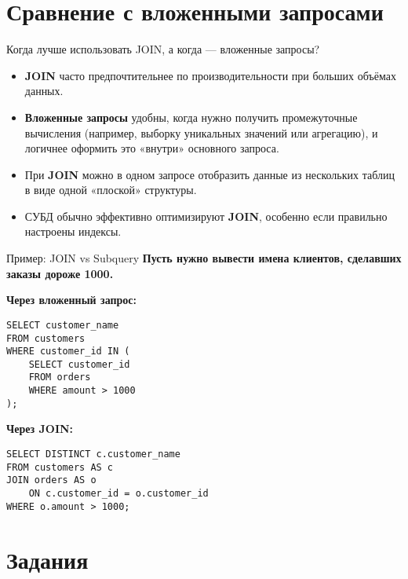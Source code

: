 \documentclass{beamer}
\begin{document}
\section{Сравнение с вложенными запросами}
\begin{frame}{Когда лучше использовать JOIN, а когда — вложенные запросы?}
	\begin{itemize}
		\item \textbf{JOIN} часто предпочтительнее по производительности при больших объёмах данных.
		\item \textbf{Вложенные запросы} удобны, когда нужно получить промежуточные вычисления
		      (например, выборку уникальных значений или агрегацию), и логичнее оформить это «внутри» основного запроса.
		\item При \textbf{JOIN} можно в одном запросе отобразить данные из нескольких таблиц
		      в виде одной «плоской» структуры.
		\item СУБД обычно эффективно оптимизируют \textbf{JOIN}, особенно если правильно настроены индексы.
	\end{itemize}
\end{frame}

\begin{frame}[fragile]{Пример: JOIN vs Subquery}
	\textbf{Пусть нужно вывести имена клиентов, сделавших заказы дороже 1000.}

	\textbf{Через вложенный запрос:}
	\begin{verbatim}
SELECT customer_name
FROM customers
WHERE customer_id IN (
    SELECT customer_id
    FROM orders
    WHERE amount > 1000
);
\end{verbatim}

	\textbf{Через JOIN:}
	\begin{verbatim}
SELECT DISTINCT c.customer_name
FROM customers AS c
JOIN orders AS o
    ON c.customer_id = o.customer_id
WHERE o.amount > 1000;
\end{verbatim}
\end{frame}

\section{Задания}

\end{document}
